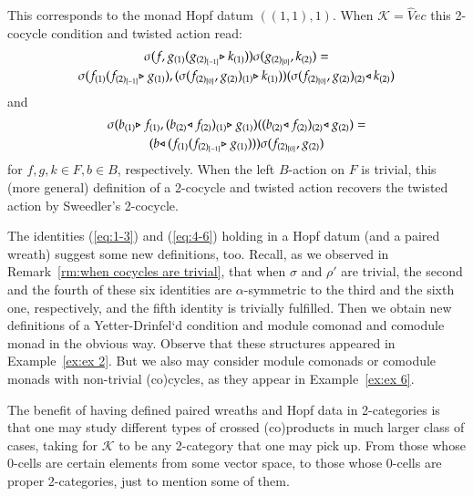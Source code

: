 \documentclass[a4paper, 12pt]{article}
\renewcommand{\_}[1]{\mbox{$_{\left( #1 \right)}$}}
\theoremstyle{plain}
\newcommand{\rtr}{\hspace{-0,08cm}\triangleright}
\newcommand{\ltr}{\hspace{-0,08cm}\triangleleft}
\newcommand{\C}{{\mathcal C}}
\def\K{{\mathcal K}}  %
\newcommand{\exref}[1]{Example~\ref{ex:#1}}
\newcommand{\equref}[1]{(\ref{eq:#1})}
\newcommand{\rmref}[1]{Remark~\ref{rm:#1}}
\begin{document}
\noindent This corresponds to the monad Hopf datum $((1,1),1)$. 
When $\K=\hat Vec$ this 2-cocycle condition and twisted action read: 
\begin{multline}
 \sigma(f,g_{(1)} (g_{(2)_{[-1]}}\rtr k_{(1)})) \sigma(g_{(2)_{[0]}}, k_{(2)}) = \\
\sigma(f_{(1)}(f_{(2)_{[-1]}}\rtr g_{(1)}), (\sigma(f_{(2)_{[0]}}, g_{(2)})_{(1)}\rtr k_{(1)})) (\sigma(f_{(2)_{[0]}}, g_{(2)})_{(2)}\ltr k_{(2)}) 
\end{multline}
and 
\begin{multline}
 \sigma(b_{(1)}\rtr f_{(1)}, (b_{(2)}\ltr f_{(2)})_{(1)}\rtr g_{(1)}) ((b_{(2)}\ltr f_{(2)})_{(2)}\ltr g_{(2)}) = \\
(b\ltr (f_{(1)}(f_{(2)_{[-1]}}\rtr g_{(1)}))) \sigma(f_{(2)_{[0]}}, g_{(2)}) 
\end{multline}
for $f,g,k\in F, b\in B$, respectively.
When the left $B$-action on $F$ is trivial, this (more general) definition of a 2-cocycle and twisted action recovers the twisted action by Sweedler's 2-cocycle.  


\bigskip

The identities \equref{1-3} and \equref{4-6} holding in a Hopf datum (and a paired wreath) suggest some new definitions, too. Recall, as we observed in \rmref{when cocycles are trivial}, 
that when $\sigma$ and $\rho'$ are trivial, the second and the fourth of these six identities are $\alpha$-symmetric to the third and the sixth one, respectively, 
and the fifth identity is trivially fulfilled. 
Then we obtain new definitions of a Yetter-Drinfel`d condition and module comonad and comodule monad in the obvious way. Observe that these structures appeared in \exref{ex 2}. 
But we also may consider module comonads or comodule monads with non-trivial (co)cycles, as they appear in \exref{ex 6}. 



\bigskip


The benefit of having defined paired wreaths and Hopf data in 2-categories is that one may study different types of crossed (co)products in much larger class of cases, taking for 
$\K$ to be any 2-category that one may pick up. From those %
whose 0-cells are certain elements from some vector space, to those whose 0-cells are proper 2-categories, just to mention some of them. 
\end{document}
